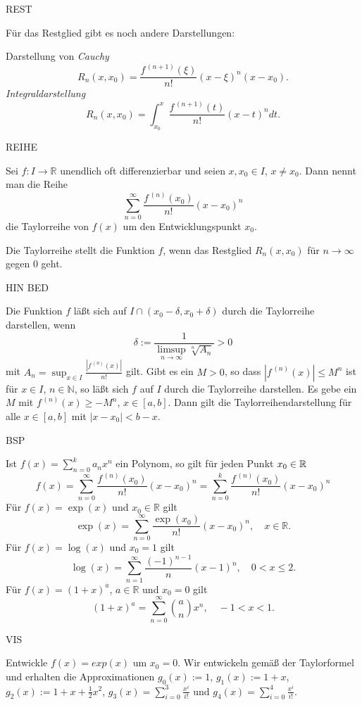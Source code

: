 \documentclass[fontsize=12pt,paper=a4,twoside,bibtotoc,idxtotoc,
liststotoc,pagesize,BCOR1.2cm,DIV15,chapterprefix,pagesize=pdftex]{scrbook}
\theoremstyle{plain}
\theoremstyle{definition}
\theoremstyle{remark}
\begin{document}
REST

Für das Restglied gibt es noch andere Darstellungen:

 Darstellung von \emph{Cauchy}
\[ R_n(x,x_0)= \frac{f^{\,(n+1)}(\xi)}{n!} (x- \xi)^{n}(x-x_0).\]
 \emph{Integraldarstellung}
\[ R_n(x,x_0)= \int_{x_0}^x \frac{f^{\,(n+1)}(t)}{n!}  (x-t)^n dt.\]


REIHE

Sei $f:I \rightarrow \mathbb{R}$ unendlich oft  differenzierbar und seien
$x,x_0 \in I$, $x \neq x_0$. Dann nennt man die Reihe
\[ \sum_{n=0}^\infty \frac{f^{\,(n)}(x_0)}{n!}(x-x_0)^n \]
die {\color{red} Taylorreihe} von $f(x)$ um den Entwicklungspunkt
{\color{red} $x_0$}.

\bigskip
Die Taylorreihe stellt die Funktion $f$, wenn das Restglied $R_n(x,x_0)$ für $n
\rightarrow \infty$ gegen $0$ geht.

HIN BED


 Die Funktion $f$ läßt sich auf $I\cap (x_0-\delta, x_0+\delta)$ durch die Taylorreihe darstellen, wenn
\[
\delta:= \frac{1}{\limsup_{n \rightarrow \infty} \sqrt[n]{A_n}}>0
 \]
mit $A_n=\sup_{x \in I}  \frac{|f^{\,(n)}(x)|}{n!}$ gilt.
 Gibt es ein $M>0$, so dass $|f^{\,(n)}(x)|\leq M^n$ ist für $x \in
I$, $n \in \mathbb{N}$, so läßt sich $f$ auf $I$ durch die Taylorreihe
darstellen.
 Es gebe ein $M$ mit  $f^{\,(n)}(x)\geq -M^n$, $x \in [a,b]$. Dann
gilt die Taylorreihendarstellung für alle $x \in [a,b]$ mit
$|x-x_0|<b-x$. 


BSP


 Ist $f(x) = \sum_{n=0}^k a_n x^n$ ein Polynom, so gilt für jeden Punkt $x_0 \in \mathbb{R}$
\[
 f(x) = \sum_{n=0}^\infty \frac{f^{\,(n)}(x_0)}{n!}(x-x_0)^n 
 = \sum_{n=0}^k  \frac{f^{\,(n)}(x_0)}{n!}(x-x_0)^n
\]
 Für $f(x)=\exp(x)$ und $x_0 \in \mathbb{R}$ gilt 
\[ \exp(x)= \sum_{n=0}^\infty \frac{\exp(x_0)}{n!} (x-x_0)^n, \quad x
\in \mathbb{R}.\]
 Für $f(x)=\log(x)$ und $x_0=1$ gilt
\[ \log (x) = \sum_{n=1}^\infty \frac{(-1)^{n-1}}{n}(x-1)^n, \quad 0 <
x \leq 2.\]
 Für $f(x)= (1+x)^a$, $a\in \mathbb{R}$  und $x_0=0$ gilt
\[ (1+x)^a= \sum_{n =0}^\infty \binom{a}{n}{x^n}, \quad -1 <
x < 1. \]


VIS

Entwickle $f(x)=exp(x)$ um $x_0=0$. Wir entwickeln gemäß der Taylorformel und erhalten die
Approximationen $g_0(x):=1$, $g_1(x):=1+x$,
$g_2(x):=1+x+\frac{1}{2}x^2$, $g_3(x)=\sum_{i=0}^3 \frac{x^i}{i!}$ und 
$g_4(x)=\sum_{i=0}^4 \frac{x^i}{i!}$.
\end{document}
